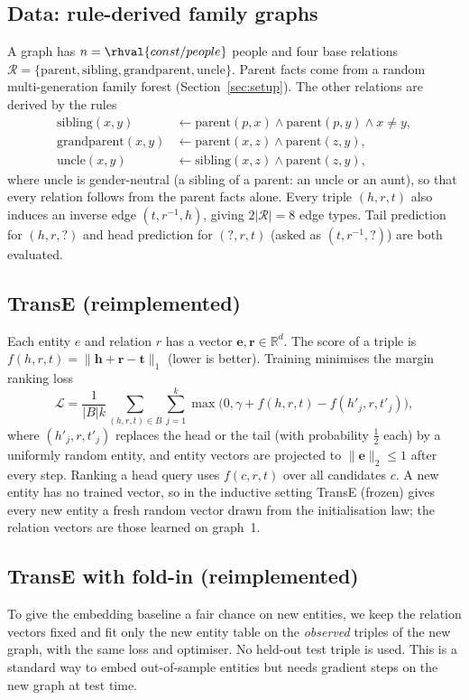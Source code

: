 \subsection{Data: rule-derived family graphs}
A graph has $n=\rhval{const/people}$ people and four base relations $\mathcal R=\{\text{parent},\text{sibling},\text{grandparent},\text{uncle}\}$. Parent facts come from a random multi-generation family forest (Section~\ref{sec:setup}). The other relations are derived by the rules
\begin{align}
\text{sibling}(x,y)&\leftarrow \text{parent}(p,x)\wedge\text{parent}(p,y)\wedge x\neq y,\\
\text{grandparent}(x,y)&\leftarrow \text{parent}(x,z)\wedge\text{parent}(z,y),\\
\text{uncle}(x,y)&\leftarrow \text{sibling}(x,z)\wedge\text{parent}(z,y),
\end{align}
where uncle is gender-neutral (a sibling of a parent: an uncle or an aunt), so that every relation follows from the parent facts alone. Every triple $(h,r,t)$ also induces an inverse edge $(t,r^{-1},h)$, giving $2|\mathcal R|=8$ edge types. Tail prediction for $(h,r,?)$ and head prediction for $(?,r,t)$ (asked as $(t,r^{-1},?)$) are both evaluated.

\subsection{TransE (reimplemented)}
Each entity $e$ and relation $r$ has a vector $\mathbf e,\mathbf r\in\mathbb R^{d}$. The score of a triple is $f(h,r,t)=\lVert \mathbf h+\mathbf r-\mathbf t\rVert_1$ (lower is better). Training minimises the margin ranking loss
\begin{equation}
\mathcal L=\frac1{|B|k}\sum_{(h,r,t)\in B}\sum_{j=1}^{k}\max\big(0,\gamma+f(h,r,t)-f(h'_j,r,t'_j)\big),
\end{equation}
where $(h'_j,r,t'_j)$ replaces the head or the tail (with probability $\tfrac12$ each) by a uniformly random entity, and entity vectors are projected to $\lVert\mathbf e\rVert_2\le1$ after every step. Ranking a head query uses $f(c,r,t)$ over all candidates $c$. A new entity has no trained vector, so in the inductive setting TransE (frozen) gives every new entity a fresh random vector drawn from the initialisation law; the relation vectors are those learned on graph~1.

\subsection{TransE with fold-in (reimplemented)}
To give the embedding baseline a fair chance on new entities, we keep the relation vectors fixed and fit only the new entity table on the \emph{observed} triples of the new graph, with the same loss and optimiser. No held-out test triple is used. This is a standard way to embed out-of-sample entities but needs gradient steps on the new graph at test time.

